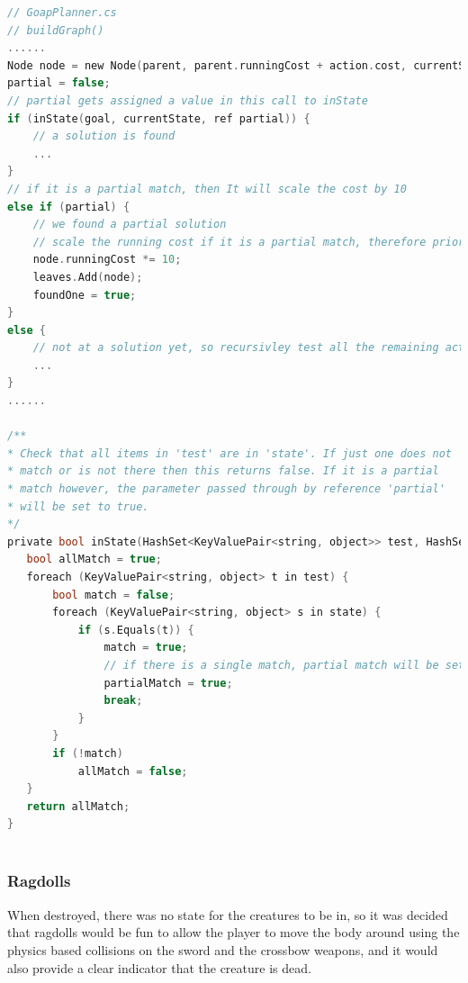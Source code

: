 \documentclass[11pt]{report}
\begin{document}
\begin{lstlisting}[language=c]
// GoapPlanner.cs
// buildGraph()
......
Node node = new Node(parent, parent.runningCost + action.cost, currentState, action);
partial = false;
// partial gets assigned a value in this call to inState
if (inState(goal, currentState, ref partial)) {
    // a solution is found   
    ...
}
// if it is a partial match, then It will scale the cost by 10
else if (partial) {
    // we found a partial solution
    // scale the running cost if it is a partial match, therefore prioritising full matches
    node.runningCost *= 10; 
    leaves.Add(node);
    foundOne = true;
}
else {
    // not at a solution yet, so recursivley test all the remaining actions and branch out the tree
    ...
}
......

/**
* Check that all items in 'test' are in 'state'. If just one does not
* match or is not there then this returns false. If it is a partial
* match however, the parameter passed through by reference 'partial'
* will be set to true.
*/
private bool inState(HashSet<KeyValuePair<string, object>> test, HashSet<KeyValuePair<string, object>> state, ref bool partialMatch) {
   bool allMatch = true;
   foreach (KeyValuePair<string, object> t in test) {
       bool match = false;
       foreach (KeyValuePair<string, object> s in state) {
           if (s.Equals(t)) {
               match = true;
               // if there is a single match, partial match will be set to true
               partialMatch = true;
               break;
           }
       }
       if (!match)
           allMatch = false;
   }
   return allMatch;
}



\end{lstlisting}

\subsubsection{Ragdolls}
When destroyed, there was no state for the creatures to be in, so it was decided that ragdolls would be fun to allow the player to move the body around using the physics based collisions on the sword and the crossbow weapons, and it would also provide a clear indicator that the creature is dead.
\end{document}
